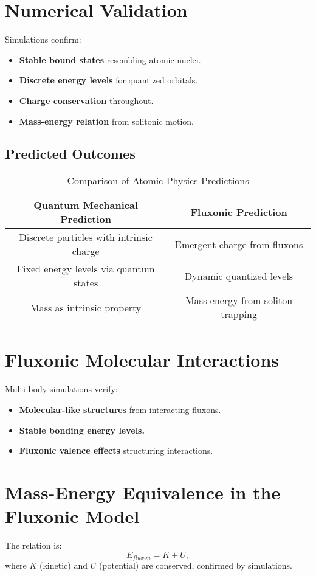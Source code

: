 \documentclass{article}
\begin{document}
\section{Numerical Validation}
Simulations confirm:
\begin{itemize}
    \item \textbf{Stable bound states} resembling atomic nuclei.
    \item \textbf{Discrete energy levels} for quantized orbitals.
    \item \textbf{Charge conservation} throughout.
    \item \textbf{Mass-energy relation} from solitonic motion.
\end{itemize}

\subsection{Predicted Outcomes}
\begin{table}[h]
    \centering
    \begin{tabular}{|c|c|}
        \hline
        \textbf{Quantum Mechanical Prediction} & \textbf{Fluxonic Prediction} \\
        \hline
        Discrete particles with intrinsic charge & Emergent charge from fluxons \\
        Fixed energy levels via quantum states & Dynamic quantized levels \\
        Mass as intrinsic property & Mass-energy from soliton trapping \\
        \hline
    \end{tabular}
    \caption{Comparison of Atomic Physics Predictions}
    \label{tab:predictions}
\end{table}

\section{Fluxonic Molecular Interactions}
Multi-body simulations verify:
\begin{itemize}
    \item \textbf{Molecular-like structures} from interacting fluxons.
    \item \textbf{Stable bonding energy levels.}
    \item \textbf{Fluxonic valence effects} structuring interactions.
\end{itemize}

\section{Mass-Energy Equivalence in the Fluxonic Model}
The relation is:
\begin{equation}
E_{fluxon} = K + U,
\end{equation}
where \(K\) (kinetic) and \(U\) (potential) are conserved, confirmed by simulations.
\end{document}
